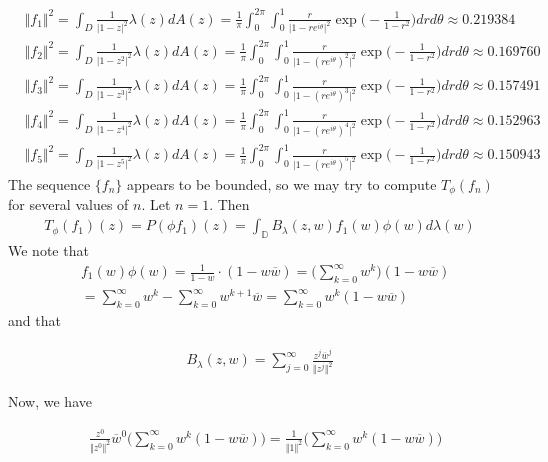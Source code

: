 \documentclass[12pt]{article}
\begin{document}
\begin{align*}
&\Vert f_1 \Vert^2 = \int_D \frac{1}{\vert 1 - z \vert^2} \lambda(z) dA(z) = \frac{1}{\pi} \int_0^{2\pi} \int_0^1 \frac{r}{\vert 1 - re^{i\theta} \vert^2} \exp\bigg(-\frac{1}{1-r^2}\bigg) dr d\theta \approx 0.219384 \\
&\Vert f_2 \Vert^2 = \int_D \frac{1}{\vert 1 - z^2 \vert^2} \lambda(z) dA(z) = \frac{1}{\pi} \int_0^{2\pi} \int_0^1 \frac{r}{\vert 1 - (re^{i\theta})^2 \vert^2} \exp\bigg(-\frac{1}{1-r^2}\bigg) dr d\theta \approx 0.169760 \\
&\Vert f_3 \Vert^2 = \int_D \frac{1}{\vert 1 - z^3 \vert^2} \lambda(z) dA(z) = \frac{1}{\pi} \int_0^{2\pi} \int_0^1 \frac{r}{\vert 1 - (re^{i\theta})^3 \vert^2} \exp\bigg(-\frac{1}{1-r^2}\bigg) dr d\theta \approx 0.157491\\
&\Vert f_4 \Vert^2 = \int_D \frac{1}{\vert 1 - z^4 \vert^2} \lambda(z) dA(z) = \frac{1}{\pi} \int_0^{2\pi} \int_0^1 \frac{r}{\vert 1 - (re^{i\theta})^4 \vert^2} \exp\bigg(-\frac{1}{1-r^2}\bigg) dr d\theta \approx 0.152963\\
&\Vert f_5 \Vert^2 = \int_D \frac{1}{\vert 1 - z^5 \vert^2} \lambda(z) dA(z) = \frac{1}{\pi} \int_0^{2\pi} \int_0^1 \frac{r}{\vert 1 - (re^{i\theta})^5 \vert^2} \exp\bigg(-\frac{1}{1-r^2}\bigg) dr d\theta \approx 0.150943
\end{align*}
The sequence $\{f_n\}$ appears to be bounded, so  we may try to compute $T_\phi(f_n)$ for several values of $n$. Let $n = 1$. Then
\begin{align*}
T_\phi(f_1)(z) = P(\phi f_1)(z) = \int_\mathbb{D} B_\lambda(z,w) f_1(w) \phi(w) d\lambda(w)
\end{align*}
We note that
\begin{align*}
&f_1(w) \phi(w) = \frac{1}{1-w} \cdot (1-w\overline{w}) = \Bigg(\sum_{k=0}^\infty w^k\Bigg)(1 - w\overline{w}) 
\\ &= \sum_{k=0}^\infty w^k - \sum_{k = 0}^\infty w^{k+1} \overline{w} = \sum_{k=0}^\infty w^k(1- w\overline{w})
\end{align*} and that

\begin{align*}
B_\lambda(z,w) = \sum_{j=0}^\infty \frac{z^j \overline{w}^j}{\Vert z^j \Vert^2} 
\end{align*}

 Now, we have

\begin{align*}
&\frac{z^0}{\Vert z^0 \Vert^2} \overline{w}^0 \Bigg( \sum_{k=0}^\infty w^k(1- w\overline{w}) \Bigg)= \frac{1}{\Vert 1 \Vert^2} \Bigg( \sum_{k=0}^\infty w^k(1- w\overline{w}) \Bigg)
\end{align*}
\end{document}

